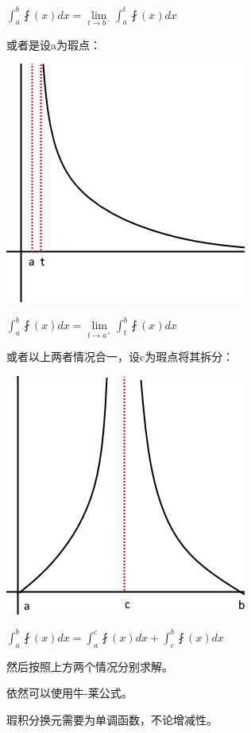 \documentclass[UTF8]{ctexbook}
\newcommand{\limNormal}[1]{\lim\limits_{#1}}
\newcommand{\defFunction}[1]{\fint(#1)}
\newcommand{\definiteIntegral}[2]{\int^{#1}_{#2}}
\begin{document}
{{{{  $\definiteIntegral{b}{a}\defFunction{x}dx = \limNormal{t \to b^-}\definiteIntegral{t}{a}\defFunction{x}dx$

  或者是设a为瑕点：

  \includegraphics[scale=0.5]{resources/infityFunctionUnormalIntegral2.png}

  $\definiteIntegral{b}{a}\defFunction{x}dx = \limNormal{t \to a^+}\definiteIntegral{b}{t}\defFunction{x}dx$

  或者以上两者情况合一，设c为瑕点将其拆分：

  \includegraphics{resources/infityFunctionUnormalIntegral3.png}

  $\definiteIntegral{b}{a}\defFunction{x}dx = \definiteIntegral{c}{a}\defFunction{x}dx + \definiteIntegral{b}{c}\defFunction{x}dx$

  然后按照上方两个情况分别求解。

  依然可以使用牛-莱公式。

  瑕积分换元需要为单调函数，不论增减性。

}%

}}}
\end{document}
